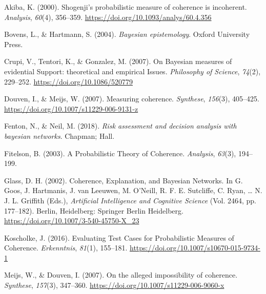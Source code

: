 \documentclass[
  10pt,
]{scrartcl}
\newlength{\cslhangindent}
\newlength{\cslentryspacingunit} %
\newenvironment{CSLReferences}[2] %
 {%
  \setlength{\parindent}{0pt}
  \ifodd #1
  \let\oldpar\par
  \def\par{\hangindent=\cslhangindent\oldpar}
  \fi
  \setlength{\parskip}{#2\cslentryspacingunit}
 }%
 {}
\begin{document}
\hypertarget{refs}{}
\begin{CSLReferences}{1}{0}
\leavevmode{}%
Akiba, K. (2000). Shogenji's probabilistic measure of coherence is incoherent. \emph{Analysis}, \emph{60}(4), 356--359. \url{https://doi.org/10.1093/analys/60.4.356}

\leavevmode{}%
Bovens, L., \& Hartmann, S. (2004). \emph{Bayesian epistemology}. Oxford University Press.

\leavevmode{}%
Crupi, V., Tentori, K., \& Gonzalez, M. (2007). On {Bayesian measures} of {evidential Support}: {theoretical} and {empirical Issues}. \emph{Philosophy of Science}, \emph{74}(2), 229--252. \url{https://doi.org/10.1086/520779}

\leavevmode{}%
Douven, I., \& Meijs, W. (2007). Measuring coherence. \emph{Synthese}, \emph{156}(3), 405--425. \url{https://doi.org/10.1007/s11229-006-9131-z}

\leavevmode{}%
Fenton, N., \& Neil, M. (2018). \emph{Risk assessment and decision analysis with bayesian networks}. Chapman; Hall.

\leavevmode{}%
Fitelson, B. (2003). A {Probabilistic Theory} of {Coherence}. \emph{Analysis}, \emph{63}(3), 194--199.

\leavevmode{}%
Glass, D. H. (2002). Coherence, {Explanation}, and {Bayesian Networks}. In G. Goos, J. Hartmanis, J. van Leeuwen, M. O'Neill, R. F. E. Sutcliffe, C. Ryan, \ldots{} N. J. L. Griffith (Eds.), \emph{Artificial {Intelligence} and {Cognitive Science}} (Vol. 2464, pp. 177--182). {Berlin, Heidelberg}: {Springer Berlin Heidelberg}. \url{https://doi.org/10.1007/3-540-45750-X_23}

\leavevmode{}%
Koscholke, J. (2016). Evaluating {Test Cases} for {Probabilistic Measures} of {Coherence}. \emph{Erkenntnis}, \emph{81}(1), 155--181. \url{https://doi.org/10.1007/s10670-015-9734-1}

\leavevmode{}%
Meijs, W., \& Douven, I. (2007). On the alleged impossibility of coherence. \emph{Synthese}, \emph{157}(3), 347--360. \url{https://doi.org/10.1007/s11229-006-9060-x}


\end{CSLReferences}
\end{document}
